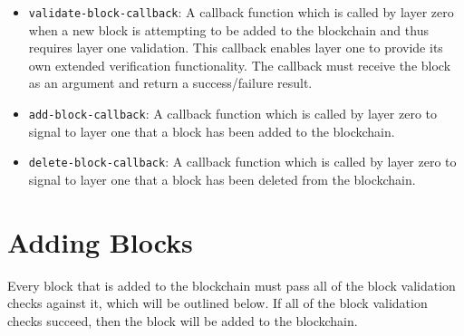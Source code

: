 \documentclass[12pt]{article}
\begin{document}
\begin{itemize}
\item \texttt{validate-block-callback}: A callback function which is called by layer zero when a new block is attempting to be added to the blockchain and thus requires layer one validation. This callback enables layer one to provide its own extended verification functionality. The callback must receive the block as an argument and return a success/failure result.
\item \texttt{add-block-callback}: A callback function which is called by layer zero to signal to layer one that a block has been added to the blockchain.
\item \texttt{delete-block-callback}: A callback function which is called by layer zero to signal to layer one that a block has been deleted from the blockchain.
\end{itemize}

\section{Adding Blocks}
Every block that is added to the blockchain must pass all of the block validation checks against it, which will be outlined below. If all of the block validation checks succeed, then the block will be added to the blockchain.
\end{document}
